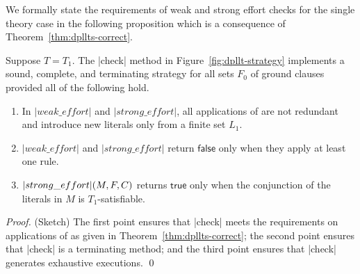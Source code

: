 \documentclass{svjour3}                     %
\begin{document}

We formally state the requirements of weak and strong effort checks 
for the single theory case in the following proposition
which is a consequence of Theorem~\ref{thm:dpllts-correct}.

\begin{proposition}
\label{prop:dpllt-strat}
Suppose $T = T_1$.
The |check| method in Figure~\ref{fig:dpllt-strategy} implements
a sound, complete, and terminating strategy for all sets $F_0$ of ground clauses provided all of the following hold.
\begin{enumerate}
\item 
In $|weak\_effort|$ and $|strong\_effort|$, all applications of  
are not redundant and 
introduce new literals only from a finite set $L_1$.
\item 
$|weak\_effort|$ and $|strong\_effort|$ %
return $\mathsf{false}$ only when they apply at least one rule.
\item $|strong\_effort|( M, F, C )$ returns $\mathsf{true}$ 
only when the conjunction of the literals in $M$ is $T_1$-satisfiable.
\end{enumerate}
\end{proposition}
\begin{proof} (Sketch)
The first point ensures that |check| meets the requirements 
on applications of  as given in Theorem~\ref{thm:dpllts-correct};
the second point ensures that |check| is a terminating method; and
the third point ensures that |check| generates exhaustive executions.
\qed
\end{proof}
\end{document}

